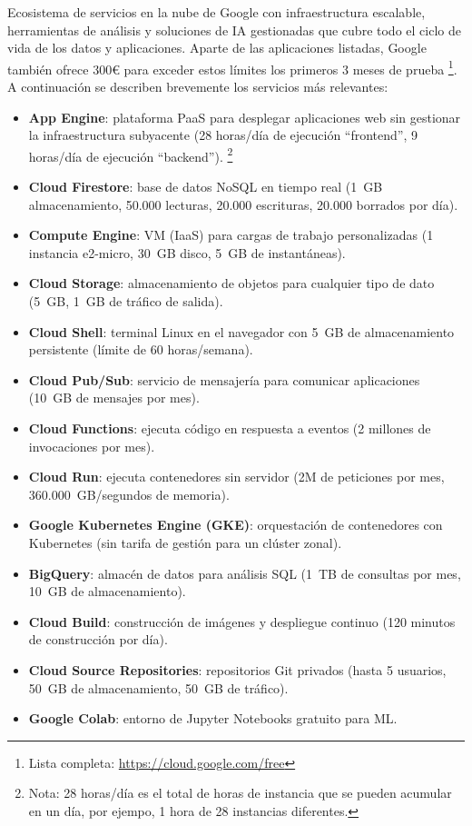 Ecosistema de servicios en la nube de Google con infraestructura escalable, herramientas de análisis y soluciones de IA gestionadas que cubre todo el ciclo de vida de los datos y aplicaciones. Aparte de las aplicaciones listadas, Google también ofrece 300€ para exceder estos límites los primeros 3 meses de prueba \footnote{Lista completa: \url{https://cloud.google.com/free}}. A continuación se describen brevemente los servicios más relevantes:

\begin{itemize}
	\item \textbf{App Engine}: plataforma PaaS para desplegar aplicaciones web sin gestionar la infraestructura subyacente (28 horas/día de ejecución ``frontend'', 9 horas/día de ejecución ``backend''). \footnote{Nota: 28 horas/día es el total de horas de instancia que se pueden acumular en un día, por ejempo, 1 hora de 28 instancias diferentes.}
	\item \textbf{Cloud Firestore}: base de datos NoSQL en tiempo real (1~GB almacenamiento, 50.000 lecturas, 20.000 escrituras, 20.000 borrados por día).
	\item \textbf{Compute Engine}: VM (IaaS) para cargas de trabajo personalizadas (1 instancia e2-micro, 30~GB disco, 5~GB de instantáneas).
	\item \textbf{Cloud Storage}: almacenamiento de objetos para cualquier tipo de dato (5~GB, 1~GB de tráfico de salida).
	\item \textbf{Cloud Shell}: terminal Linux en el navegador con 5~GB de almacenamiento persistente (límite de 60 horas/semana).
	\item \textbf{Cloud Pub/Sub}: servicio de mensajería para comunicar aplicaciones (10~GB de mensajes por mes).
	\item \textbf{Cloud Functions}: ejecuta código en respuesta a eventos (2 millones de invocaciones por mes).
	\item \textbf{Cloud Run}: ejecuta contenedores sin servidor (2M de peticiones por mes, 360.000~GB/segundos de memoria).
	\item \textbf{Google Kubernetes Engine (GKE)}: orquestación de contenedores con Kubernetes (sin tarifa de gestión para un clúster zonal).
	\item \textbf{BigQuery}: almacén de datos para análisis SQL (1~TB de consultas por mes, 10~GB de almacenamiento).
	\item \textbf{Cloud Build}: construcción de imágenes y despliegue continuo (120 minutos de construcción por día).
	\item \textbf{Cloud Source Repositories}: repositorios Git privados (hasta 5 usuarios, 50~GB de almacenamiento, 50~GB de tráfico).
	\item \textbf{Google Colab}: entorno de Jupyter Notebooks gratuito para ML.
\end{itemize}

